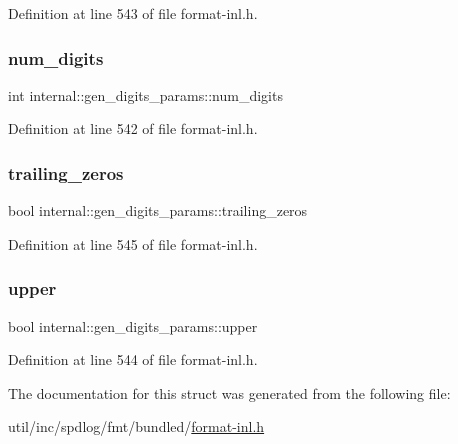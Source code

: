 Definition at line 543 of file format-\/inl.\+h.

\mbox{\label{structinternal_1_1gen__digits__params_ae41da23da39ec0ec45c1510e3d01e928}} 
\subsubsection{\texorpdfstring{num\+\_\+digits}{num\_digits}}
{\footnotesize\ttfamily int internal\+::gen\+\_\+digits\+\_\+params\+::num\+\_\+digits}



Definition at line 542 of file format-\/inl.\+h.

\mbox{\label{structinternal_1_1gen__digits__params_aab16ed7c814d239c1ca62222c02045a4}} 
\subsubsection{\texorpdfstring{trailing\+\_\+zeros}{trailing\_zeros}}
{\footnotesize\ttfamily bool internal\+::gen\+\_\+digits\+\_\+params\+::trailing\+\_\+zeros}



Definition at line 545 of file format-\/inl.\+h.

\mbox{\label{structinternal_1_1gen__digits__params_a16bbeb7ea07da0c0a562f0248fe8a600}} 
\subsubsection{\texorpdfstring{upper}{upper}}
{\footnotesize\ttfamily bool internal\+::gen\+\_\+digits\+\_\+params\+::upper}



Definition at line 544 of file format-\/inl.\+h.



The documentation for this struct was generated from the following file\+:\begin{DoxyCompactItemize}
\item 
util/inc/spdlog/fmt/bundled/\hyperlink{format-inl_8h}{format-\/inl.\+h}\end{DoxyCompactItemize}
